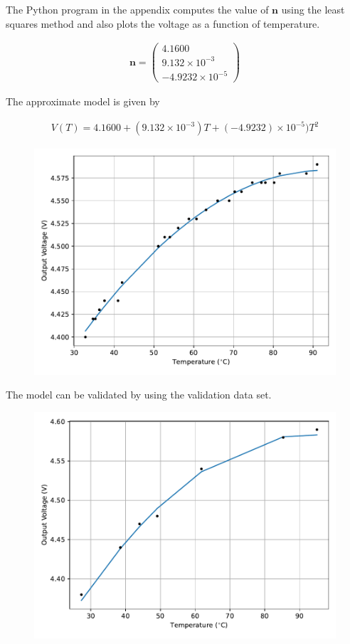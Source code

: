 \documentclass{article}
\let\vec\mathbf
\newcommand{\myvec}[1]{\ensuremath{\begin{pmatrix}#1\end{pmatrix}}}
\begin{document}
The Python program in the appendix computes the value of $\vec{n}$ using
the least squares method and also plots the voltage as a function of temperature.

\begin{align*}
    \vec{n} = \myvec{4.1600\\ 9.132 \times 10^{-3} \\ -4.9232 \times 10^{-5}}
\end{align*}

The approximate model is given by 

\begin{align*}
    V(T) = 4.1600 + (9.132 \times 10^{-3})T + (-4.9232) \times 10^{-5})T^2
\end{align*}

\begin{figure}[h!]
\centering
\includegraphics[width=0.75\linewidth]{figs/train}
\end{figure}

The model can be validated by using the validation data set.

\begin{figure}[h!]
\centering
\includegraphics[width=0.75\linewidth]{figs/valid}
\end{figure}
\end{document}
